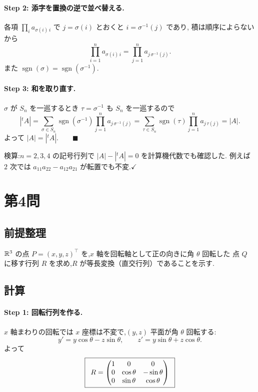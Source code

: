 \documentclass[11pt,a4paper]{article}
\begin{document}
\paragraph{Step 2: 添字を置換の逆で並べ替える.}
各項 $\prod_i a_{\sigma(i)\,i}$ で $j=\sigma(i)$ とおくと $i=\sigma^{-1}(j)$ であり,
積は順序によらないから
\[
\prod_{i=1}^{n}a_{\sigma(i)\,i}=\prod_{j=1}^{n}a_{j\,\sigma^{-1}(j)}.
\]
また $\operatorname{sgn}(\sigma)=\operatorname{sgn}(\sigma^{-1})$.

\paragraph{Step 3: 和を取り直す.}
$\sigma$ が $S_n$ を一巡するとき $\tau=\sigma^{-1}$ も $S_n$ を一巡するので
\[
|{}^tA|=\sum_{\sigma\in S_n}\operatorname{sgn}(\sigma^{-1})\prod_{j=1}^{n}a_{j\,\sigma^{-1}(j)}
=\sum_{\tau\in S_n}\operatorname{sgn}(\tau)\prod_{j=1}^{n}a_{j\,\tau(j)}=|A|.
\]
よって $|A|=|{}^tA|$.$\qquad\blacksquare$

検算:$n=2,3,4$ の記号行列で $|A|-|{}^tA|=0$ を計算機代数でも確認した.
例えば $2$ 次では $a_{11}a_{22}-a_{12}a_{21}$ が転置でも不変.$\checkmark$

\section*{第4問}

\subsection*{前提整理}

$\mathbb{R}^3$ の点 $P=(x,y,z)^\top$ を,$x$ 軸を回転軸として正の向きに角 $\theta$ 回転した
点 $Q$ に移す行列 $R$ を求め,$R$ が等長変換（直交行列）であることを示す.

\subsection*{計算}

\paragraph{Step 1: 回転行列を作る.}
$x$ 軸まわりの回転では $x$ 座標は不変で,$(y,z)$ 平面が角 $\theta$ 回転する:
\[
y'=y\cos\theta-z\sin\theta,\qquad z'=y\sin\theta+z\cos\theta.
\]
よって
\[
\ans{\
R=\begin{pmatrix}1&0&0\\0&\cos\theta&-\sin\theta\\0&\sin\theta&\cos\theta\end{pmatrix}\ }
\]
\end{document}
